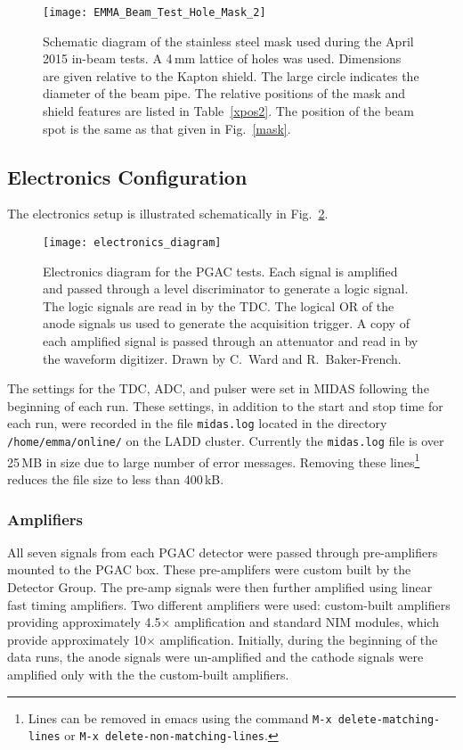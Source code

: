 \begin{figure}[t]
\centering
\texttt{[image: EMMA\_Beam\_Test\_Hole\_Mask\_2]}
\caption{Schematic diagram of the stainless steel mask used during the April 2015 in-beam tests. A 4\,mm lattice of holes was used. Dimensions are given relative to the Kapton shield.  The large circle indicates the diameter of the beam pipe.  The relative positions of the mask and shield features are listed in Table~\ref{xpos2}.
The position of the beam spot is the same as that given in Fig.~\ref{mask}.}%
\label{mask2}%
\end{figure}

\subsection{Electronics Configuration}
The electronics setup is illustrated schematically in Fig.~\ref{e-diagram}.
\begin{figure}[p]
\centering
\texttt{[image: electronics\_diagram]}
\caption{Electronics diagram for the PGAC tests. Each signal is amplified and passed through a level discriminator to generate a logic signal. The logic signals are read in by the TDC. The logical OR of the anode signals us used to generate the acquisition trigger. A copy of each amplified signal is passed through an attenuator and read in by the waveform digitizer. Drawn by C.\ Ward and R.\ Baker-French.}%
\label{e-diagram}%
\end{figure}
The settings for the TDC, ADC, and pulser were set in MIDAS following the beginning of each run. These settings, in addition to the start and stop time for each run, were recorded in the file \texttt{midas.log} located in  the directory 
\verb|/home/emma/online/| on the LADD cluster. Currently the \texttt{midas.log} file is over 25\,MB in size due to large number of error messages. Removing these lines\footnote{Lines can be removed in emacs using the command \texttt{M-x delete-matching-lines} or \texttt{M-x delete-non-matching-lines}.} reduces the file size to less than 400\,kB.
\subsubsection{Amplifiers}
\label{amp-settings}
All seven signals from each PGAC detector were passed through pre-amplifiers mounted to the PGAC box.  These pre-amplifers were custom built by the Detector Group.  The pre-amp signals were then further amplified using linear fast timing amplifiers.  Two different amplifiers were used: custom-built amplifiers providing approximately 4.5$\times$ amplification and standard %
NIM modules, which provide approximately 10$\times$ amplification. Initially, during the beginning of the data runs, the anode signals were un-amplified and the cathode signals were amplified only  with the the custom-built amplifiers.

